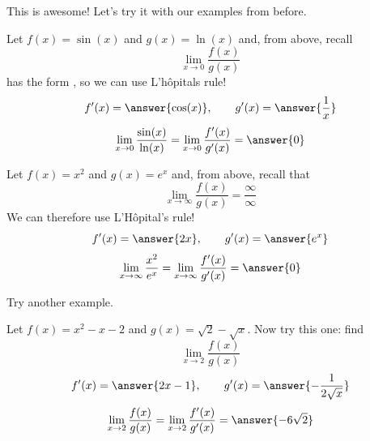 \documentclass{ximera}
\begin{document}
This is awesome! Let's try it with our examples from before.

\begin{example}\label{example:10-8}
Let $f(x)=\sin (x)$ and $g(x)=\ln (x)$ and, from above, recall
\[
\lim _{x \rightarrow 0} \frac{f(x)}{g(x)}
\]
has the form , so we can use L'hôpitals rule!
\[
f^{\prime}(x)=\answer{\cos(x)}, \qquad g^{\prime}(x)=\answer{\frac{1}{x}}
\]
\[
\lim _{x \rightarrow 0} \frac{\sin (x)}{\ln (x)}=\lim _{x \rightarrow 0} \frac{f^{\prime}(x)}{g^{\prime}(x)}=\answer{0}
\]
\end{example}

\begin{example}\label{example:10-9}
Let $f(x)=x^{2}$ and $g(x)=e^{x}$ and, from above, recall that
\[
\lim _{x \rightarrow \infty} \frac{f(x)}{g(x)}=\frac{\infty}{\infty}
\]
We can therefore use L'Hôpital's rule!
\[
f^{\prime}(x)=\answer{2x}, \qquad g^{\prime}(x)=\answer{e^{x}}
\]
\[
\lim _{x \rightarrow \infty} \frac{x^{2}}{e^{x}}=\lim _{x \rightarrow \infty} \frac{f^{\prime}(x)}{g^{\prime}(x)}=\answer{0}
\]
\end{example}

Try another example.

\begin{exercise}\label{exercise:10-10}
Let $f(x)=x^{2}-x-2$ and $g(x)=\sqrt{2}-\sqrt{x}$. Now try this one: find
\[
\lim _{x \rightarrow 2} \frac{f(x)}{g(x)}
\]
\[
f^{\prime}(x)=\answer{2x-1}, \qquad g^{\prime}(x)=\answer{-\frac{1}{2\sqrt{x}}}
\]
\[
\lim _{x \rightarrow 2} \frac{f(x)}{g(x)}=\lim _{x \rightarrow 2} \frac{f^{\prime}(x)}{g^{\prime}(x)}=\answer{-6\sqrt{2}}
\]
\end{exercise}
\end{document}
